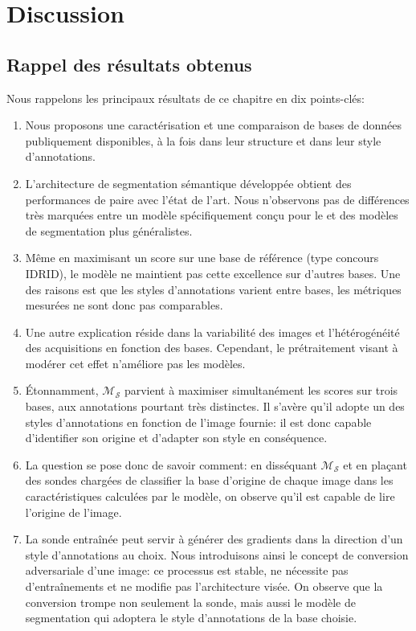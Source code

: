 \section{Discussion}
\subsection{Rappel des résultats obtenus}
Nous rappelons les principaux résultats de ce chapitre en dix points-clés:
\begin{enumerate}
	\item Nous proposons une caractérisation et une comparaison de bases de données publiquement disponibles, à la fois dans leur structure et dans leur style d'annotations.
	\item L'architecture de segmentation sémantique développée obtient des performances de paire avec l'état de l'art. Nous n'observons pas de différences très marquées entre un modèle spécifiquement conçu pour le \fundus{} et des modèles de segmentation plus généralistes.
	\item Même en maximisant un score sur une base de référence (type concours IDRID), le modèle ne maintient pas cette excellence sur d'autres bases. Une des raisons est que les styles d'annotations varient entre bases, les métriques mesurées ne sont donc pas comparables.
	\item Une autre explication réside dans la variabilité des images et l'hétérogénéité des acquisitions en fonction des bases. Cependant, le prétraitement visant à modérer cet effet n'améliore pas les modèles.
	\item Étonnamment, $\mathcal{M}_\mathcal{S}$ parvient à maximiser simultanément les scores sur trois bases, aux annotations pourtant très distinctes. Il s'avère qu'il adopte un des styles d'annotations en fonction de l'image fournie: il est donc capable d'identifier son origine et d'adapter son style en conséquence.
	\item La question se pose donc de savoir comment: en disséquant $\mathcal{M}_\mathcal{S}$ et en plaçant des sondes chargées de classifier la base d'origine de chaque image dans les caractéristiques calculées par le modèle, on observe qu'il est capable de \og lire \fg l'origine de l'image.
	\item La sonde entraînée peut servir à générer des gradients dans la direction d'un style d'annotations au choix. Nous introduisons ainsi le concept de conversion adversariale d'une image: ce processus est stable, ne nécessite pas d'entraînements et ne modifie pas l'architecture visée. On observe que la conversion trompe non seulement la sonde, mais aussi le modèle de segmentation qui adoptera le style d'annotations de la base choisie.

\end{enumerate}
